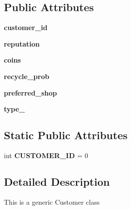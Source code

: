 \subsection*{Public Attributes}
\begin{DoxyCompactItemize}
\item 
\mbox{\label{class_customer_1_1_customer_aab3ad437a6d6d65d52a5a1876ba55132}} 
{\bfseries customer\+\_\+id}
\item 
\mbox{\label{class_customer_1_1_customer_a7a1bf903055ef024dfcce238793cc76f}} 
{\bfseries reputation}
\item 
\mbox{\label{class_customer_1_1_customer_a59e00114c437f593fe212790ddd55427}} 
{\bfseries coins}
\item 
\mbox{\label{class_customer_1_1_customer_afeb97ca795d191873b7f27e41fab51a8}} 
{\bfseries recycle\+\_\+prob}
\item 
\mbox{\label{class_customer_1_1_customer_a9e378cb96ffdae61f782c87af9a624a1}} 
{\bfseries preferred\+\_\+shop}
\item 
\mbox{\label{class_customer_1_1_customer_acfb18b95ddf55e0606859f23b033b0d1}} 
{\bfseries type\+\_\+}
\end{DoxyCompactItemize}
\subsection*{Static Public Attributes}
\begin{DoxyCompactItemize}
\item 
\mbox{\label{class_customer_1_1_customer_a586cec6760e6de897c1c1b692fb24c0e}} 
int {\bfseries C\+U\+S\+T\+O\+M\+E\+R\+\_\+\+ID} = 0
\end{DoxyCompactItemize}


\subsection{Detailed Description}
\begin{DoxyVerb}This is a generic Customer class
\end{DoxyVerb}
 

